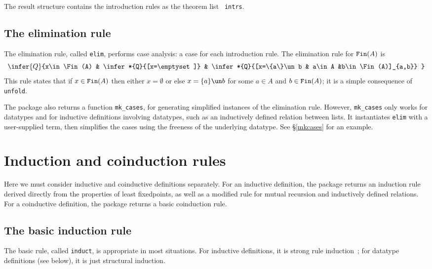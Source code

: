 The result structure contains the introduction rules as the theorem list {\tt
intrs}.

\subsection{The elimination rule}
The elimination rule, called {\tt elim}, performs case analysis: a
case for each introduction rule.  The elimination rule
for ${\tt Fin}(A)$ is
\[ \infer{Q}{x\in\Fin(A) & \infer*{Q}{[x=\emptyset]}
                 & \infer*{Q}{[x=\{a\}\un b & a\in A &b\in\Fin(A)]_{a,b}} }
\]
This rule states that if $x\in{\tt Fin}(A)$ then either $x=\emptyset$ or else
$x=\{a\}\un b$ for some $a\in A$ and $b\in{\tt Fin}(A)$; it is a simple consequence
of {\tt unfold}.

\ifCADE{}\else
The package also returns a function {\tt mk\_cases}, for generating simplified
instances of the elimination rule.  However, {\tt mk\_cases} only works for
datatypes and for inductive definitions involving datatypes, such as an
inductively defined relation between lists.  It instantiates {\tt elim}
with a user-supplied term, then simplifies the cases using the freeness of
the underlying datatype.
See \S\ref{mkcases} for an example.
\fi

\section{Induction and coinduction rules}
Here we must consider inductive and coinductive definitions separately.
For an inductive definition, the package returns an induction rule derived
directly from the properties of least fixedpoints, as well as a modified
rule for mutual recursion and inductively defined relations.  For a
coinductive definition, the package returns a basic coinduction rule.

\subsection{The basic induction rule}\label{basic-ind-sec}
The basic rule, called {\tt induct}, is appropriate in most situations.
For inductive definitions, it is strong rule induction~\cite{camilleri92}; for
datatype definitions (see below), it is just structural induction.  

